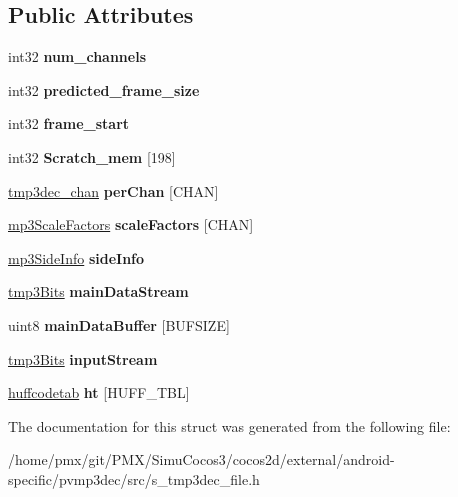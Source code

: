 \subsection*{Public Attributes}
\begin{DoxyCompactItemize}
\item 
\mbox{\label{structtmp3dec__file_a264e4b3c371f1963fd7c327bc5117719}} 
int32 {\bfseries num\+\_\+channels}
\item 
\mbox{\label{structtmp3dec__file_a38c2d03eeb7d53f25c81e6921472f034}} 
int32 {\bfseries predicted\+\_\+frame\+\_\+size}
\item 
\mbox{\label{structtmp3dec__file_acbf3c73d9b10825f6c7dfcaaaacf6b07}} 
int32 {\bfseries frame\+\_\+start}
\item 
\mbox{\label{structtmp3dec__file_a6d8fae8c28c5d79268f83a7686b1926d}} 
int32 {\bfseries Scratch\+\_\+mem} \mbox{[}198\mbox{]}
\item 
\mbox{\label{structtmp3dec__file_a9ae289e9320439a92de7eeae2e9234ae}} 
\hyperlink{structtmp3dec__chan}{tmp3dec\+\_\+chan} {\bfseries per\+Chan} \mbox{[}C\+H\+AN\mbox{]}
\item 
\mbox{\label{structtmp3dec__file_a4b0f3424528e7438fdc0b3c1f1637cde}} 
\hyperlink{structmp3ScaleFactors}{mp3\+Scale\+Factors} {\bfseries scale\+Factors} \mbox{[}C\+H\+AN\mbox{]}
\item 
\mbox{\label{structtmp3dec__file_abe18beec4cd7b14410abbb01604f6903}} 
\hyperlink{structmp3SideInfo}{mp3\+Side\+Info} {\bfseries side\+Info}
\item 
\mbox{\label{structtmp3dec__file_a4500ed9bb87642b7b36bb6ea6f5bf3c0}} 
\hyperlink{structtmp3Bits}{tmp3\+Bits} {\bfseries main\+Data\+Stream}
\item 
\mbox{\label{structtmp3dec__file_a10b7ba15a574ed3540338c2aad2cdbed}} 
uint8 {\bfseries main\+Data\+Buffer} \mbox{[}B\+U\+F\+S\+I\+ZE\mbox{]}
\item 
\mbox{\label{structtmp3dec__file_a9bd72d37def6c6c9888be54ff6f500ee}} 
\hyperlink{structtmp3Bits}{tmp3\+Bits} {\bfseries input\+Stream}
\item 
\mbox{\label{structtmp3dec__file_a3360426c921b200bd0eacaa9cdffbcdc}} 
\hyperlink{structhuffcodetab}{huffcodetab} {\bfseries ht} \mbox{[}H\+U\+F\+F\+\_\+\+T\+BL\mbox{]}
\end{DoxyCompactItemize}


The documentation for this struct was generated from the following file\+:\begin{DoxyCompactItemize}
\item 
/home/pmx/git/\+P\+M\+X/\+Simu\+Cocos3/cocos2d/external/android-\/specific/pvmp3dec/src/s\+\_\+tmp3dec\+\_\+file.\+h\end{DoxyCompactItemize}
